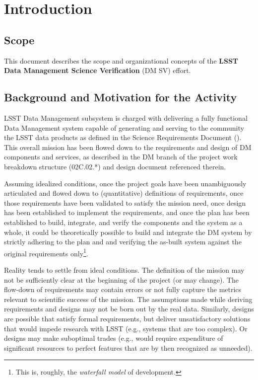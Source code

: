 \section{Introduction \label{sect:intro}}


\subsection{Scope \label{sect:scope}}

This document describes the scope and organizational concepts of the
{\bf LSST Data Management Science Verification} (DM SV) effort. 

\subsection{Background and Motivation for the Activity}

LSST Data Management subsystem is charged with delivering a fully functional
Data Management system capable of generating and serving to the community
the LSST data products as defined in the Science Requirements
Document (\SRD).  This overall mission has been flowed down to the
requirements and design of DM components and services, as described in the
DM branch of the project work breakdown structure (02C.02.*) and design
document referenced therein.

Assuming idealized conditions, once the project goals have been unambiguously
articulated and flowed down to (quantitative) definitions of requirements,
once those requirements have been validated to satisfy the mission need,
once design has been established to implement the requirements, and once the
plan has been established to build, integrate, and verify the components and
the system as a whole, it could be theoretically possible to build and
integrate the DM system by strictly adhering to the plan and and verifying
the as-built system against the original requirements only\footnote{This is,
roughly, the {\em waterfall model} of development.}.

Reality tends to settle from ideal conditions.  The
definition of the mission may not be sufficiently clear at the beginning of
the project (or may change).  The flow-down of requirements may contain
errors or not fully capture the metrics relevant to scientific success of
the mission.  The assumptions made while deriving requirements and designs
may not be born out by the real data.  Similarly, designs are possible that
satisfy formal requirements, but deliver unsatisfactory solutions that would
impede research with LSST (e.g., systems that are too complex).  Or designs
may make suboptimal trades (e.g., would require expenditure of significant
resources to perfect features that are by then recognized as unneeded).

